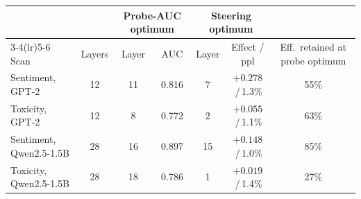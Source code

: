 \begin{tabular}{@{}l c cc cc c@{}}
\toprule
 & & \multicolumn{2}{c}{Probe-AUC optimum} & \multicolumn{2}{c}{Steering optimum} & \\
\cmidrule(lr){3-4}\cmidrule(lr){5-6}
Scan & Layers & Layer & AUC & Layer & Effect / ppl & Eff.\ retained at probe optimum \\
\midrule
Sentiment, GPT-2 & 12 & 11 & 0.816 & 7 & $+0.278$\,/\,1.3\% & 55\% \\
Toxicity, GPT-2 & 12 & 8 & 0.772 & 2 & $+0.055$\,/\,1.1\% & 63\% \\
Sentiment, Qwen2.5-1.5B & 28 & 16 & 0.897 & 15 & $+0.148$\,/\,1.0\% & 85\% \\
Toxicity, Qwen2.5-1.5B & 28 & 18 & 0.786 & 1 & $+0.019$\,/\,1.4\% & 27\% \\
\bottomrule
\end{tabular}